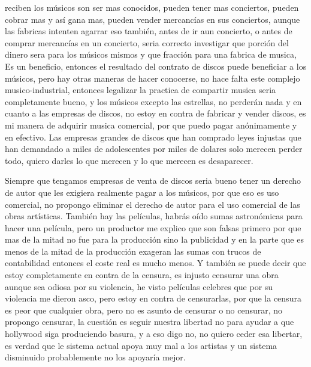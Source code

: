\begin{multicols}{2}
reciben los músicos son ser mas conocidos, pueden tener mas conciertos, pueden cobrar mas y así gana mas, pueden vender mercancías en sus conciertos, aunque las fabricas  intenten agarrar eso también, antes de ir aun concierto, o antes de comprar mercancías en un concierto, seria correcto investigar que porción del dinero sera para los músicos mismos y que fracción para una fabrica de musica, Es un beneficio, entonces el resultado del contrato de discos puede beneficiar a los músicos, pero hay otras maneras de hacer conocerse, no hace falta este complejo musico-industrial, entonces legalizar la practica de compartir musica seria completamente bueno, y los músicos excepto las estrellas, no perderán nada y en cuanto a las empresas de discos, no estoy en contra de fabricar y vender discos, es mi manera de adquirir musica comercial, por que puedo pagar anónimamente y en efectivo. Las empresas grandes de discos que han comprado leyes injustas que han demandado a miles de adolescentes por miles de dolares solo merecen perder todo, quiero darles lo que merecen y lo que merecen es desaparecer.

Siempre que tengamos empresas de venta de discos seria bueno tener un derecho de autor que les exigiera realmente pagar a los músicos, por que eso es uso comercial, no propongo eliminar el derecho de autor para el uso comercial de las obras artísticas. También hay las películas, habrás oído sumas astronómicas para hacer una película, pero un productor me explico que son falsas primero por que mas de la mitad no fue para la producción sino la publicidad y en la parte que es menos de la mitad de la producción exageran las sumas con trucos de contabilidad entonces el coste real es mucho menos. 
Y también se puede decir que {\em {\color{introcolor}{ Hollywood produce sistemáticamente basura, }}} estoy completamente en contra de la censura, es injusto censurar una obra aunque sea odiosa por su violencia, he visto películas celebres que por su violencia me dieron asco, pero estoy en contra de censurarlas, por que la censura es peor que cualquier obra, pero no es asunto de censurar o no censurar, no propongo censurar, la cuestión es seguir nuestra libertad no para ayudar a que hollywood siga produciendo basura, y a eso digo no, no quiero ceder esa libertar, es verdad que le sistema actual apoya muy mal a los artistas y un sistema disminuido probablemente no los apoyaría mejor. 



\end{multicols}

